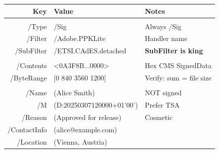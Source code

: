 \documentclass[11pt,a4paper]{article}
\begin{document}
{%
\noindent
\begin{tabular}{@{}DEF@{}}
\textsf{\bfseries\color{commentcolor} Key} &
\textsf{\bfseries\color{commentcolor} Value} &
\textsf{\bfseries\color{commentcolor} Notes} \\
\midrule

 \\
/Type      & /Sig                       & Always /Sig \\
/Filter    & /Adobe.PPKLite             & Handler name \\
/SubFilter & \color{strcolor}/ETSI.CAdES.detached & \textbf{\color{codetext}SubFilter is king} \\[3pt]

 \\
/Contents  & \color{strcolor}<0A3F8B...0000> & Hex CMS SignedData \\
/ByteRange & [0 840 3560 1200]         & Verify: sum = file size \\[3pt]

 \\
/Name        & \color{strcolor}(Alice Smith)              & NOT signed \\
/M           & \color{strcolor}(D:20250307120000+01'00')  & Prefer TSA \\
/Reason      & \color{strcolor}(Approved for release)     & Cosmetic \\
/ContactInfo & \color{strcolor}(alice@example.com)        & \\
/Location    & \color{strcolor}(Vienna, Austria)          & \\[3pt]


\end{tabular}}
\end{document}
